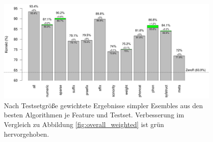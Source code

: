 
\begin{figure}[h]
    \centering
    \caption{Nach Testsetgröße gewichtete Ergebnisse simpler Esembles aus den besten Algorithmen je Feature und Testset. Verbesserung im Vergleich zu Abbildung \ref{fig:overall_weighted} ist grün hervorgehoben.}
    \label{fig:overall_bag}
    \includegraphics[width=.85\columnwidth]{figures/esemble/bag_of_best_algorithms_for_featuresets.png}
\end{figure}

